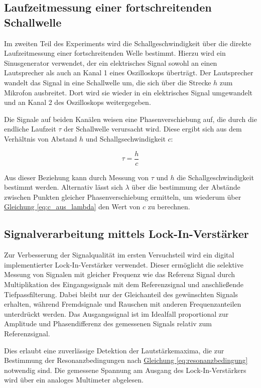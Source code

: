 \subsection{Laufzeitmessung einer fortschreitenden Schallwelle}

Im zweiten Teil des Experiments wird die Schallgeschwindigkeit über die direkte Laufzeitmessung einer fortschreitenden Welle bestimmt. Hierzu wird ein Sinusgenerator verwendet, der ein elektrisches Signal sowohl an einen Lautsprecher als auch an Kanal 1 eines Oszilloskops überträgt. Der Lautsprecher wandelt das Signal in eine Schallwelle um, die sich über die Strecke $h$ zum Mikrofon ausbreitet. Dort wird sie wieder in ein elektrisches Signal umgewandelt und an Kanal 2 des Oszilloskops weitergegeben.

Die Signale auf beiden Kanälen weisen eine Phasenverschiebung auf, die durch die endliche Laufzeit $\tau$ der Schallwelle verursacht wird. Diese ergibt sich aus dem Verhältnis von Abstand $h$ und Schallgsechwindigkeit $c$:

\begin{equation}
\tau = \frac{h}{c}
\label{eq:laufzeit}
\end{equation}

Aus dieser Beziehung kann durch Messung von $\tau$ und $h$ die Schallgeschwindigkeit bestimmt werden. Alternativ lässt sich $\lambda$ über die bestimmung der Abstände zwischen Punkten gleicher Phasenverschiebung ermitteln, um wiederum über \hyperref[eq:c_aus_lambda]{Gleichung \ref*{eq:c_aus_lambda}} den Wert von $c$ zu berechnen.

\subsection{Signalverarbeitung mittels Lock-In-Verstärker}

Zur Verbesserung der Signalqualität im ersten Versuchsteil wird ein digital implementierter Lock-In-Verstärker verwendet. Dieser ermöglicht die selektive Messung von Signalen mit gleicher Frequenz wie das Referenz Signal durch Multiplikation des Eingangssignals mit dem Referenzsignal und anschließende Tiefpassfilterung. Dabei bleibt nur der Gleichanteil des gewünschten Signals erhalten, während Fremdsignale und Rauschen mit anderen Frequenzanteilen unterdrückt werden. Das Ausgangssignal ist im Idealfall proportional zur Amplitude und Phasendifferenz des gemessenen Signals relativ zum Referenzsignal.

Dies erlaubt eine zuverlässige Detektion der Lautstärkemaxima, die zur Bestimmung der Resonanzbedingungen nach \hyperref[eq:resonanzbedingung]{Gleichung \ref*{eq:resonanzbedingung}} notwendig sind. Die gemessene Spannung am Ausgang des Lock-In-Verstärkers wird über ein analoges Multimeter abgelesen.

